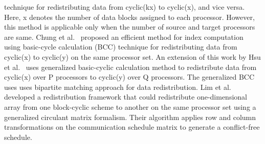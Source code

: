 \documentclass[letterpaper]{llncs}
\begin{document}
technique for redistributing data from cyclic(kx) to cyclic(x), and vice versa.
Here, x denotes the number of data blocks assigned to each processor.
However, this method is applicable only when the number of source and target processors are same.
Chung et al.~\cite{chung} proposed an efficient method for index computation using
basic-cycle calculation (BCC) technique for redistributing data from cyclic(x) to
cyclic(y) on the same processor set. An extension of this work by Hsu et al.~\cite{chung2000}
uses generalized basic-cyclic calculation method to redistribute data
from cyclic(x) over P processors to cyclic(y) over Q processors. The generalized
BCC uses uses bipartite matching approach for data redistribution.
Lim et al.~\cite{Lim96} developed a redistribution framework that could redistribute one-dimensional array from one block-cyclic scheme to another on the same processor set using a generalized circulant matrix formalism.
Their algorithm applies row and column transformations on the communication schedule matrix to generate a conflict-free schedule.
\end{document}
